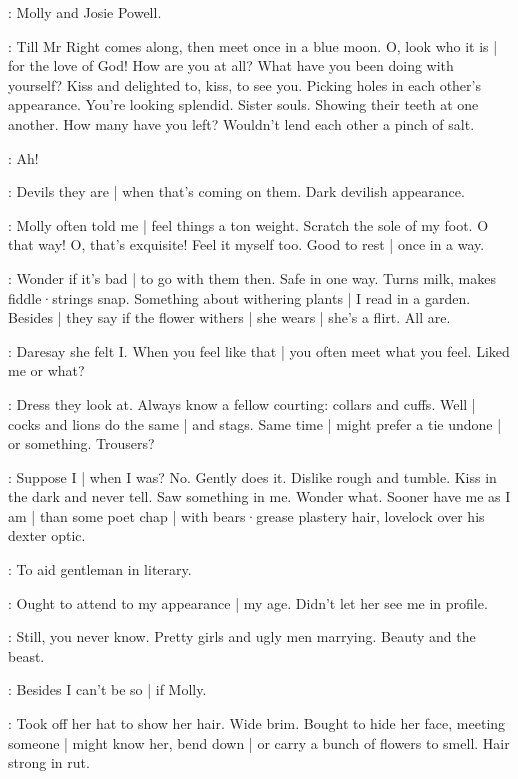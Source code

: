 \BloomHist:
Molly and Josie Powell.

\BloomAbstract:
Till Mr Right comes along,
then meet once in a blue moon.
O,
look who it is |
for the love of God!
How are you at all?
What have you been doing with yourself?
Kiss and delighted to,
kiss,
to see you.
Picking holes in each other's appearance.
You're looking splendid.
Sister souls.
Showing their teeth at one another.
How many have you left?
Wouldn't lend each other
a pinch of salt.

\BloomInt:
Ah!

\BloomAbstract:
Devils they are |
when that's coming on them.
Dark devilish appearance.

\BloomHist:
Molly often told me |
feel things a ton weight.
Scratch the sole of my foot.
O that way!
O,
that's exquisite!
Feel it myself too.
Good to rest |
once in a way.

\BloomAbstract:
Wonder if it's bad |
to go with them then.
Safe in one way.
Turns milk,
makes fiddle·strings snap.
Something about withering plants |
I read in a garden.
Besides |
they say if the flower withers |
she wears |
she's a flirt.
All are.

\BloomCurrent:
Daresay she felt I.
When you feel like that |
you often meet what you feel.
Liked me or what?

\BloomAbstract:
Dress they look at.
Always know a fellow courting:
collars and cuffs.%
Well |
cocks and lions do the same |
and stags.
Same time |
might prefer a tie undone |
or something.
Trousers?

\BloomCurrent:
Suppose I |
when I was?
No.
Gently does it.
Dislike rough and tumble.
Kiss in the dark
and never tell.
Saw something in me.
Wonder what.
Sooner have me
as I am |
than some poet chap |
with bears·grease plastery hair,
lovelock over his dexter optic.

\BloomAbstract:
To aid gentleman in literary.

\BloomCurrent:
Ought to attend to my appearance |
my age.
Didn't let her see me in profile.

\BloomAbstract:
Still,
you never know.
Pretty girls and ugly men marrying.
Beauty and the beast.

\BloomHist:
Besides I can't be so |
if Molly.

\BloomCurrent:
Took off her hat to show her hair.
Wide brim.
Bought to hide her face,
meeting someone |
might know her,
bend down |
or carry a bunch of flowers to smell.
Hair strong in rut.

